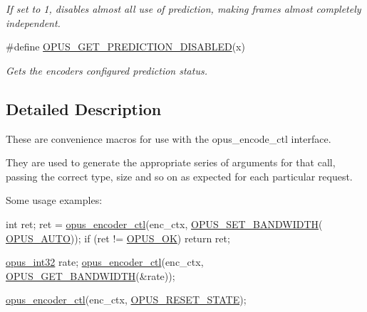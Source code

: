 \begin{DoxyCompactItemize}
\begin{DoxyCompactList}\small\item\em If set to 1, disables almost all use of prediction, making frames almost completely independent. \end{DoxyCompactList}\item 
\#define \hyperlink{group__opus__encoderctls_ga6f174467d0e244917d1cc736f9033f1d}{O\+P\+U\+S\+\_\+\+G\+E\+T\+\_\+\+P\+R\+E\+D\+I\+C\+T\+I\+O\+N\+\_\+\+D\+I\+S\+A\+B\+L\+ED}(x)
\begin{DoxyCompactList}\small\item\em Gets the encoder\textquotesingle{}s configured prediction status. \end{DoxyCompactList}\end{DoxyCompactItemize}


\subsection{Detailed Description}
These are convenience macros for use with the {\ttfamily opus\+\_\+encode\+\_\+ctl} interface. 

They are used to generate the appropriate series of arguments for that call, passing the correct type, size and so on as expected for each particular request.

Some usage examples\+:


\begin{DoxyCode}
\textcolor{keywordtype}{int} ret;
ret = \hyperlink{group__opus__encoder_ga164cbb0425238961919adf1db67949df}{opus\_encoder\_ctl}(enc\_ctx, \hyperlink{group__opus__encoderctls_ga0178dabe5526d5b0667d81489cc93791}{OPUS\_SET\_BANDWIDTH}(
      \hyperlink{group__opus__ctlvalues_ga1c5b3244b018ff4548d2d6bffa418472}{OPUS\_AUTO}));
\textcolor{keywordflow}{if} (ret != \hyperlink{group__opus__errorcodes_gaa44cf8a185e1b5cb940ef63eb4f02d21}{OPUS\_OK}) \textcolor{keywordflow}{return} ret;

\hyperlink{opus__types_8h_aa4d309d6f80b99dbabebc8f98879ab9a}{opus\_int32} rate;
\hyperlink{group__opus__encoder_ga164cbb0425238961919adf1db67949df}{opus\_encoder\_ctl}(enc\_ctx, \hyperlink{group__opus__genericctls_ga29db1d9b5e670debec54d1163ad2ec62}{OPUS\_GET\_BANDWIDTH}(&rate));

\hyperlink{group__opus__encoder_ga164cbb0425238961919adf1db67949df}{opus\_encoder\_ctl}(enc\_ctx, \hyperlink{group__opus__genericctls_gadc74e4fa8bcdf9994187d52d92207337}{OPUS\_RESET\_STATE});
\end{DoxyCode}


